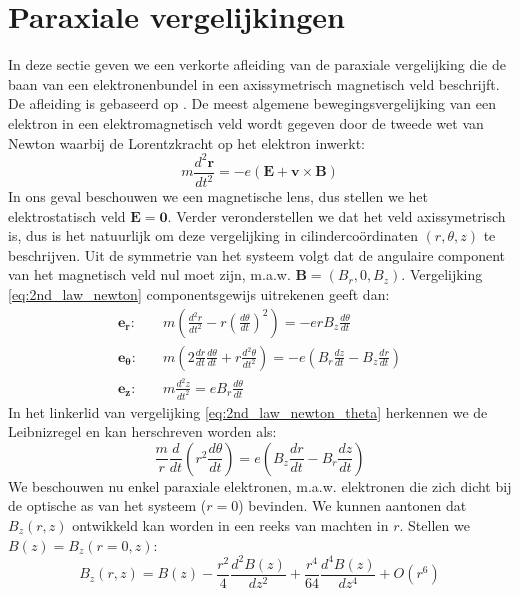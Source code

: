 \documentclass[we,twoside,openright,a4paper,11pt]{uantwerpenbamathesis}
\begin{document}
\section{Paraxiale vergelijkingen}
In deze sectie geven we een verkorte afleiding van de paraxiale vergelijking die de baan van een elektronenbundel in een axissymetrisch magnetisch veld beschrijft. De afleiding is gebaseerd op \cite{PWHawkes}. De meest algemene bewegingsvergelijking van een elektron in een elektromagnetisch veld wordt gegeven door de tweede wet van Newton waarbij de Lorentzkracht op het elektron inwerkt:
\begin{equation}\label{eq:2nd_law_newton}
    m\frac{d^2\mathbf{r}}{dt^2}=-e(\mathbf{E}+\mathbf{v}\times\mathbf{B})
\end{equation}
In ons geval beschouwen we een magnetische lens, dus stellen we het elektrostatisch veld $\mathbf{E}=\mathbf{0}$. Verder veronderstellen we dat het veld axissymetrisch is, dus is het natuurlijk om deze vergelijking in cilindercoördinaten $(r, \theta, z)$ te beschrijven. Uit de symmetrie van het systeem volgt dat de angulaire component van het magnetisch veld nul moet zijn, m.a.w. $\mathbf{B}=(B_r, 0, B_z)$. Vergelijking \ref{eq:2nd_law_newton} componentsgewijs uitrekenen geeft dan:
\begin{align}
    \mathbf{e_r}: \quad & m\left(\frac{d^2r}{dt^2}-r\left(\frac{d\theta}{dt}\right)^2\right) = -erB_z\frac{d\theta}{dt} \label{eq:2nd_law_newton_r} \\[6pt]
    \mathbf{e_\theta}: \quad & m\left(2\frac{dr}{dt}\frac{d\theta}{dt}+r\frac{d^2\theta}{dt^2}\right) = -e\left(B_r\frac{dz}{dt}-B_z\frac{dr}{dt}\right) \label{eq:2nd_law_newton_theta} \\[6pt]
    \mathbf{e_z}: \quad & m\frac{d^2z}{dt^2} = eB_r\frac{d\theta}{dt} \label{eq:2nd_law_newton_z}
\end{align}
In het linkerlid van vergelijking \ref{eq:2nd_law_newton_theta} herkennen we de Leibnizregel en kan herschreven worden als:
\begin{equation}\label{eq:theta_tussenstap}
    \frac{m}{r}\frac{d}{dt}\left(r^2\frac{d\theta}{dt}\right)=e\left(B_z\frac{dr}{dt}-B_r\frac{dz}{dt}\right)
\end{equation}
We beschouwen nu enkel paraxiale elektronen, m.a.w. elektronen die zich dicht bij de optische as van het systeem ($r=0$) bevinden. We kunnen aantonen dat $B_z(r, z)$ ontwikkeld kan worden in een reeks van machten in $r$. Stellen we $B(z)=B_z(r=0, z)$:
\begin{equation}\label{eq:b_z_expansion}
    B_z(r, z)=B(z)-\frac{r^2}{4}\frac{d^2B(z)}{dz^2}+\frac{r^4}{64}\frac{d^4B(z)}{dz^4}+O(r^6)
\end{equation}
\end{document}
